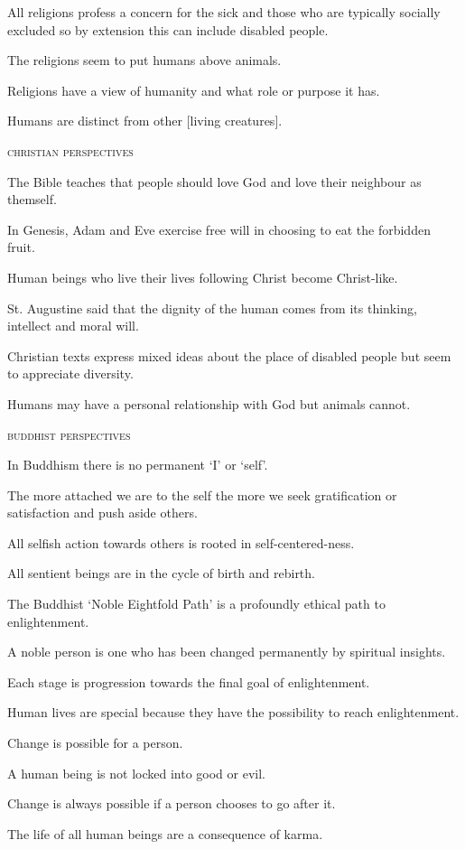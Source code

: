 \documentclass{article}
\begin{document}
All religions profess a concern for the sick and those who are typically socially excluded so by extension this can include disabled people.

The religions seem to put humans above animals.

Religions have a view of humanity and what role or purpose it has.

Humans are distinct from other [living creatures].

\textsc{christian perspectives}

The Bible teaches that people should love God and love their neighbour as themself.

In Genesis, Adam and Eve exercise free will in choosing to eat the forbidden fruit.

Human beings who live their lives following Christ become Christ-like.

St. Augustine said that the dignity of the human comes from its thinking, intellect and moral will.

Christian texts express mixed ideas about the place of disabled people but seem to appreciate diversity.

Humans may have a personal relationship with God but animals cannot.

\textsc{buddhist perspectives}

In Buddhism there is no permanent `I' or `self'.

The more attached we are to the self the more we seek gratification or satisfaction and push aside others.

All selfish action towards others is rooted in self-centered-ness.

All sentient beings are in the cycle of birth and rebirth.

The Buddhist `Noble Eightfold Path' is a profoundly ethical path to enlightenment.

A noble person is one who has been changed permanently by spiritual insights.

Each stage is progression towards the final goal of enlightenment.

Human lives are special because they have the possibility to reach enlightenment.

Change is possible for a person.

A human being is not locked into good or evil.

Change is always possible if a person chooses to go after it.

The life of all human beings are a consequence of karma.
\end{document}
